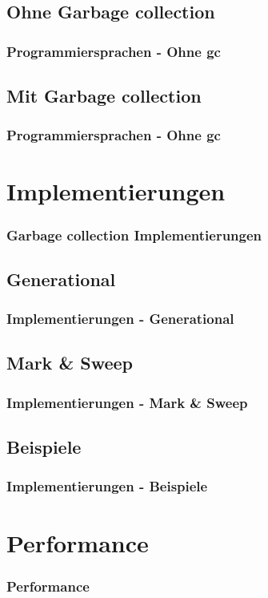 \documentclass{beamer}
\begin{document}
        \subsection{Ohne Garbage collection}
            \begin{frame}
                \frametitle{Programmiersprachen - Ohne gc}
            \end{frame}

        \subsection{Mit Garbage collection}
            \begin{frame}
                \frametitle{Programmiersprachen - Ohne gc}
            \end{frame}

    \section{Implementierungen}
        \begin{frame}
            \frametitle{Garbage collection Implementierungen}
        \end{frame}

        \subsection{Generational}
            \begin{frame}
                \frametitle{Implementierungen - Generational}
            \end{frame}

        \subsection{Mark \& Sweep}
            \begin{frame}
                \frametitle{Implementierungen - Mark \& Sweep}
            \end{frame}

        \subsection{Beispiele}
            \begin{frame}
                \frametitle{Implementierungen - Beispiele}
            \end{frame}

    \section{Performance}
        \begin{frame}
            \frametitle{Performance}
        \end{frame}
\end{document}
